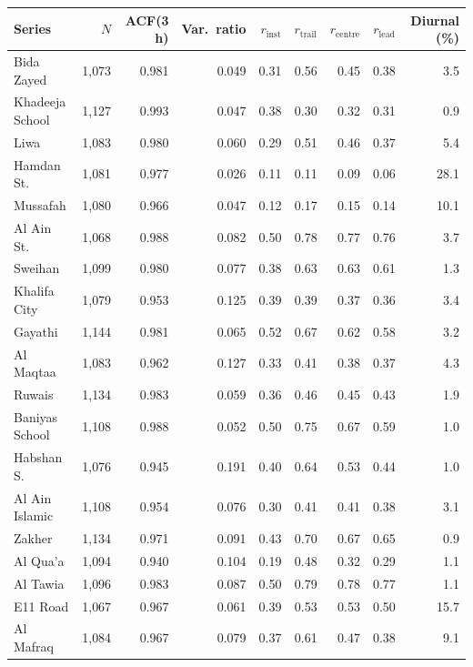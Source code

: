 \begin{tabular}{lrrrrrrrr}\toprule
Series & $N$ & ACF(3 h) & Var.\ ratio & $r_\mathrm{inst}$ & $r_\mathrm{trail}$ & $r_\mathrm{centre}$ & $r_\mathrm{lead}$ & Diurnal (\%) \\ \midrule
Bida Zayed & 1{,}073 & 0.981 & 0.049 & 0.31 & 0.56 & 0.45 & 0.38 & 3.5 \\
Khadeeja School & 1{,}127 & 0.993 & 0.047 & 0.38 & 0.30 & 0.32 & 0.31 & 0.9 \\
Liwa & 1{,}083 & 0.980 & 0.060 & 0.29 & 0.51 & 0.46 & 0.37 & 5.4 \\
Hamdan St. & 1{,}081 & 0.977 & 0.026 & 0.11 & 0.11 & 0.09 & 0.06 & 28.1 \\
Mussafah & 1{,}080 & 0.966 & 0.047 & 0.12 & 0.17 & 0.15 & 0.14 & 10.1 \\
Al Ain St. & 1{,}068 & 0.988 & 0.082 & 0.50 & 0.78 & 0.77 & 0.76 & 3.7 \\
Sweihan & 1{,}099 & 0.980 & 0.077 & 0.38 & 0.63 & 0.63 & 0.61 & 1.3 \\
Khalifa City & 1{,}079 & 0.953 & 0.125 & 0.39 & 0.39 & 0.37 & 0.36 & 3.4 \\
Gayathi & 1{,}144 & 0.981 & 0.065 & 0.52 & 0.67 & 0.62 & 0.58 & 3.2 \\
Al Maqtaa & 1{,}083 & 0.962 & 0.127 & 0.33 & 0.41 & 0.38 & 0.37 & 4.3 \\
Ruwais & 1{,}134 & 0.983 & 0.059 & 0.36 & 0.46 & 0.45 & 0.43 & 1.9 \\
Baniyas School & 1{,}108 & 0.988 & 0.052 & 0.50 & 0.75 & 0.67 & 0.59 & 1.0 \\
Habshan S. & 1{,}076 & 0.945 & 0.191 & 0.40 & 0.64 & 0.53 & 0.44 & 1.0 \\
Al Ain Islamic & 1{,}108 & 0.954 & 0.076 & 0.30 & 0.41 & 0.41 & 0.38 & 3.1 \\
Zakher & 1{,}134 & 0.971 & 0.091 & 0.43 & 0.70 & 0.67 & 0.65 & 0.9 \\
Al Qua'a & 1{,}094 & 0.940 & 0.104 & 0.19 & 0.48 & 0.32 & 0.29 & 1.1 \\
Al Tawia & 1{,}096 & 0.983 & 0.087 & 0.50 & 0.79 & 0.78 & 0.77 & 1.1 \\
E11 Road & 1{,}067 & 0.967 & 0.061 & 0.39 & 0.53 & 0.53 & 0.50 & 15.7 \\
Al Mafraq & 1{,}084 & 0.967 & 0.079 & 0.37 & 0.61 & 0.47 & 0.38 & 9.1 \\
\bottomrule\end{tabular}
